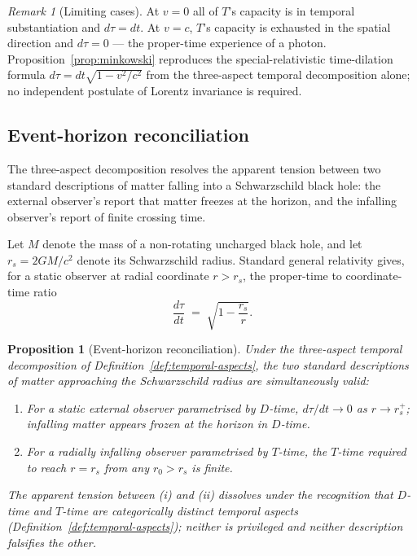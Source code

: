 \documentclass[11pt,a4paper]{article}
\newtheorem{proposition}[theorem]{Proposition}
\theoremstyle{definition}
\theoremstyle{remark}
\newtheorem{remark}[theorem]{Remark}
\begin{document}
\begin{remark}[Limiting cases]\label{rem:minkowski-limits}
At $v=0$ all of $T$'s capacity is in temporal substantiation and $d\tau = dt$. At $v=c$, $T$'s capacity is exhausted in the spatial direction and $d\tau = 0$ --- the proper-time experience of a photon. Proposition~\ref{prop:minkowski} reproduces the special-relativistic time-dilation formula $d\tau = dt\sqrt{1 - v^{2}/c^{2}}$ from the three-aspect temporal decomposition alone; no independent postulate of Lorentz invariance is required.
\end{remark}

\subsection{Event-horizon reconciliation}\label{subsec:horizon}

The three-aspect decomposition resolves the apparent tension between two standard descriptions of matter falling into a Schwarzschild black hole: the external observer's report that matter freezes at the horizon, and the infalling observer's report of finite crossing time.

Let $M$ denote the mass of a non-rotating uncharged black hole, and let $r_{s} = 2GM/c^{2}$ denote its Schwarzschild radius. Standard general relativity gives, for a static observer at radial coordinate $r > r_{s}$, the proper-time to coordinate-time ratio
\begin{equation}\label{eq:schwarzschild-ratio}
\frac{d\tau}{dt} \;=\; \sqrt{1 - \frac{r_{s}}{r}}.
\end{equation}

\begin{proposition}[Event-horizon reconciliation]\label{prop:horizon}
Under the three-aspect temporal decomposition of Definition~\ref{def:temporal-aspects}, the two standard descriptions of matter approaching the Schwarzschild radius are simultaneously valid:
\begin{enumerate}[leftmargin=*,label=(\roman*)]
\item For a static external observer parametrised by $D$-time, $d\tau/dt \to 0$ as $r \to r_{s}^{+}$; infalling matter appears frozen at the horizon in $D$-time.
\item For a radially infalling observer parametrised by $T$-time, the $T$-time required to reach $r = r_{s}$ from any $r_{0} > r_{s}$ is finite.
\end{enumerate}
The apparent tension between (i) and (ii) dissolves under the recognition that $D$-time and $T$-time are categorically distinct temporal aspects (Definition~\ref{def:temporal-aspects}); neither is privileged and neither description falsifies the other.
\end{proposition}
\end{document}
